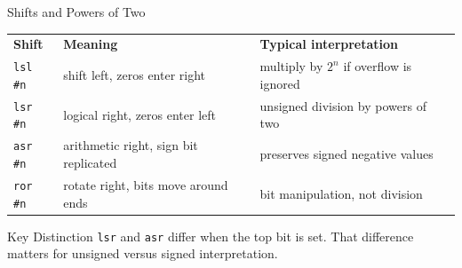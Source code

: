 \documentclass[aspectratio=169,11pt,t]{beamer}
\newcommand{\code}[1]{\texttt{#1}}
\begin{document}
\begin{frame}{Shifts and Powers of Two}
\begin{center}
\small
\renewcommand{\arraystretch}{1.14}
\begin{tabular}{
>{\raggedright\arraybackslash}m{2.3cm}
>{\raggedright\arraybackslash}m{4.0cm}
>{\raggedright\arraybackslash}m{5.0cm}
}
\rowcolor{navy}
{\color{white}\bfseries Shift} &
{\color{white}\bfseries Meaning} &
{\color{white}\bfseries Typical interpretation} \\
\rowcolor{softgray}
\code{lsl \#n} &
shift left, zeros enter right &
multiply by $2^n$ if overflow is ignored \\
\rowcolor{white}
\code{lsr \#n} &
logical right, zeros enter left &
unsigned division by powers of two \\
\rowcolor{softgray}
\code{asr \#n} &
arithmetic right, sign bit replicated &
preserves signed negative values \\
\rowcolor{white}
\code{ror \#n} &
rotate right, bits move around ends &
bit manipulation, not division \\
\end{tabular}
\end{center}
\vspace{0.2cm}
\begin{block}{Key Distinction}
\code{lsr} and \code{asr} differ when the top bit is set. That difference matters for unsigned versus signed interpretation.
\end{block}
\end{frame}










\end{document}
